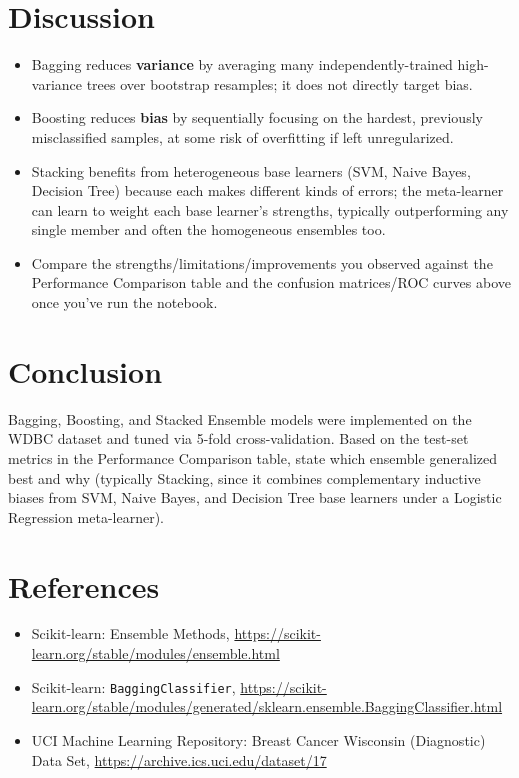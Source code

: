 \documentclass[12pt,a4paper]{article}
\begin{document}
\section{Discussion}
\label{sec:org180c7bc}
\begin{itemize}
\item Bagging reduces \textbf{variance} by averaging many independently-trained high-variance trees over
bootstrap resamples; it does not directly target bias.
\item Boosting reduces \textbf{bias} by sequentially focusing on the hardest, previously misclassified
samples, at some risk of overfitting if left unregularized.
\item Stacking benefits from heterogeneous base learners (SVM, Naive Bayes, Decision Tree) because each
makes different kinds of errors; the meta-learner can learn to weight each base learner's
strengths, typically outperforming any single member and often the homogeneous ensembles too.
\item Compare the strengths/limitations/improvements you observed against the Performance Comparison
table and the confusion matrices/ROC curves above once you've run the notebook.
\end{itemize}

\section{Conclusion}
\label{sec:orgab428c6}
Bagging, Boosting, and Stacked Ensemble models were implemented on the WDBC dataset and tuned via
5-fold cross-validation. Based on the test-set metrics in the Performance Comparison table, state
which ensemble generalized best and why (typically Stacking, since it combines complementary
inductive biases from SVM, Naive Bayes, and Decision Tree base learners under a Logistic Regression
meta-learner).

\section{References}
\label{sec:orgcb30c43}
\begin{itemize}
\item Scikit-learn: Ensemble Methods, \url{https://scikit-learn.org/stable/modules/ensemble.html}
\item Scikit-learn: \texttt{BaggingClassifier}, \url{https://scikit-learn.org/stable/modules/generated/sklearn.ensemble.BaggingClassifier.html}
\item UCI Machine Learning Repository: Breast Cancer Wisconsin (Diagnostic) Data Set, \url{https://archive.ics.uci.edu/dataset/17}
\end{itemize}
\end{document}
